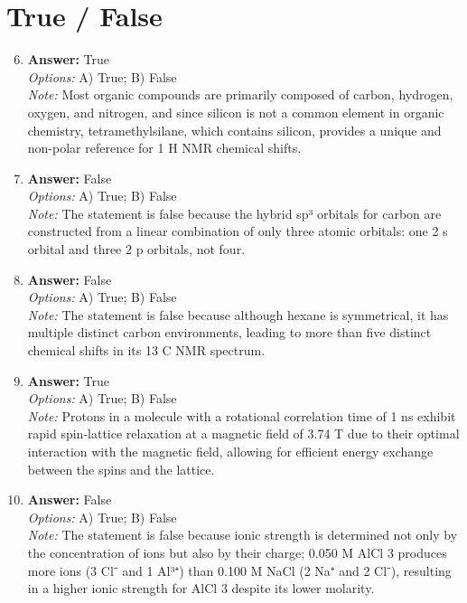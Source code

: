 \documentclass[12pt]{article}
\begin{document}
\section*{True / False}
\begin{enumerate}[label=\arabic*.]
\setcounter{enumi}{5}
\item \textbf{Answer:} True
\\ \textit{Options:} A) True; B) False
\\ \textit{Note:} Most organic compounds are primarily composed of carbon, hydrogen, oxygen, and nitrogen, and since silicon is not a common element in organic chemistry, tetramethylsilane, which contains silicon, provides a unique and non-polar reference for 1 H NMR chemical shifts.
\item \textbf{Answer:} False
\\ \textit{Options:} A) True; B) False
\\ \textit{Note:} The statement is false because the hybrid sp³ orbitals for carbon are constructed from a linear combination of only three atomic orbitals: one 2 s orbital and three 2 p orbitals, not four.
\item \textbf{Answer:} False
\\ \textit{Options:} A) True; B) False
\\ \textit{Note:} The statement is false because although hexane is symmetrical, it has multiple distinct carbon environments, leading to more than five distinct chemical shifts in its 13 C NMR spectrum.
\item \textbf{Answer:} True
\\ \textit{Options:} A) True; B) False
\\ \textit{Note:} Protons in a molecule with a rotational correlation time of 1 ns exhibit rapid spin-lattice relaxation at a magnetic field of 3.74 T due to their optimal interaction with the magnetic field, allowing for efficient energy exchange between the spins and the lattice.
\item \textbf{Answer:} False
\\ \textit{Options:} A) True; B) False
\\ \textit{Note:} The statement is false because ionic strength is determined not only by the concentration of ions but also by their charge; 0.050 M AlCl 3 produces more ions (3 Cl⁻ and 1 Al³⁺) than 0.100 M NaCl (2 Na⁺ and 2 Cl⁻), resulting in a higher ionic strength for AlCl 3 despite its lower molarity.
\end{enumerate}
\end{document}
